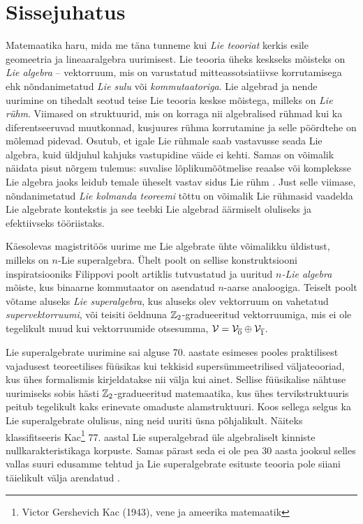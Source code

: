 
\section*{Sissejuhatus}

Matemaatika haru, mida me täna tunneme kui \emph{Lie teooriat} kerkis esile
geomeetria ja lineaaralgebra uurimisest. Lie teooria üheks keskseks mõisteks
on \emph{Lie algebra} -- vektorruum, mis on varustatud
mitteassotsiatiivse korrutamisega ehk nõndanimetatud \emph{Lie sulu} või
\emph{kommutaatoriga}.
Lie algebrad ja nende uurimine on tihedalt seotud teise Lie teooria keskse
mõistega, milleks on \emph{Lie rühm}. Viimased on
struktuurid, mis on korraga nii algebralised rühmad kui ka diferentseeruvad
muutkonnad, kusjuures rühma korrutamine ja selle pöördtehe on mõlemad
pidevad. Osutub, et igale Lie rühmale saab vastavusse seada Lie algebra, kuid
üldjuhul kahjuks vastupidine väide ei kehti. Samas on võimalik näidata
pisut nõrgem tulemus: suvalise lõplikumõõtmelise
reaalse või kompleksse Lie algebra jaoks leidub temale üheselt
vastav sidus Lie rühm \cite{kirillov2008introduction}. Just selle viimase,
nõndanimetatud \emph{Lie kolmanda teoreemi} tõttu on võimalik
Lie rühmasid vaadelda Lie algebrate kontekstis ja see teebki Lie algebrad
äärmiselt oluliseks ja efektiivseks tööriistaks.

Käesolevas magistritöös uurime me Lie algebrate ühte võimalikku üldistust,
milleks on $n$-Lie superalgebra. Ühelt poolt on sellise konstruktsiooni
inspiratsiooniks Filippovi poolt artiklis \cite{filippov1985} tutvustatud ja
uuritud \emph{$n$-Lie algebra} mõiste, kus binaarne kommutaator on asendatud
$n$-aarse analoogiga. Teiselt poolt võtame aluseks \emph{Lie superalgebra},
kus aluseks olev vektorruum on vahetatud \emph{supervektorruumi}, või
teisiti öeldnuna $\mathbb{Z}_2$-gradueeritud vektorruumiga, mis ei ole tegelikult
muud kui vektorruumide otsesumma,
$\mathcal{V} = \mathcal{V}_{\overline{0}} \oplus \mathcal{V}_{\overline{1}}$.

Lie superalgebrate uurimine sai alguse 70. aastate esimeses pooles praktilisest
vajadusest teoreetilises füüsikas kui tekkisid supersümmeetrilised
väljateooriad, kus ühes formalismis kirjeldatakse nii välja kui ainet.
Sellise füüsikalise nähtuse uurimiseks sobis hästi $\mathbb{Z}_2$-gradueeritud
matemaatika, kus ühes tervikstruktuuris peitub tegelikult kaks erinevate
omaduste alamstruktuuri. Koos sellega selgus ka Lie superalgebrate olulisus,
ning neid uuriti üsna põhjalikult. Näiteks klassifitseeris Kac\footnote{
Victor Gershevich Kac (1943), vene ja ameerika matemaatik}
77. aastal Lie superalgebrad üle algebraliselt kinniste nullkarakteristikaga
korpuste. Samas pärast seda ei ole pea 30 aasta jooksul selles vallas suuri
edusamme tehtud ja Lie superalgebrate esituste teooria pole siiani
täielikult välja arendatud \cite{musson2012lie}.

